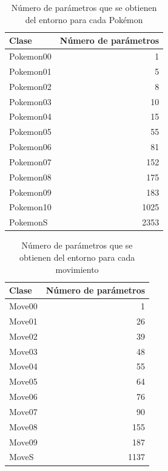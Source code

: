 \begin{table}[h]
    \centering
    \begin{tabular}{lr}
        \toprule
        Clase     & Número de parámetros \\
        \midrule
        Pokemon00 & 1                    \\
        Pokemon01 & 5                    \\
        Pokemon02 & 8                    \\
        Pokemon03 & 10                   \\
        Pokemon04 & 15                   \\
        Pokemon05 & 55                   \\
        Pokemon06 & 81                   \\
        Pokemon07 & 152                  \\
        Pokemon08 & 175                  \\
        Pokemon09 & 183                  \\
        Pokemon10 & 1025                 \\
        PokemonS  & 2353                 \\
        \bottomrule
    \end{tabular}
    \caption{Número de parámetros que se obtienen del entorno para cada Pokémon}
    \label{tab:pokemonParameters}
\end{table}

\begin{table}[h]
    \centering
    \begin{tabular}{lr}
        \toprule
        Clase  & Número de parámetros \\
        \midrule
        Move00 & 1                    \\
        Move01 & 26                   \\
        Move02 & 39                   \\
        Move03 & 48                   \\
        Move04 & 55                   \\
        Move05 & 64                   \\
        Move06 & 76                   \\
        Move07 & 90                   \\
        Move08 & 155                  \\
        Move09 & 187                  \\
        MoveS  & 1137                 \\
        \bottomrule
    \end{tabular}
    \caption{Número de parámetros que se obtienen del entorno para cada movimiento}
    \label{tab:moveParameters}
\end{table}
